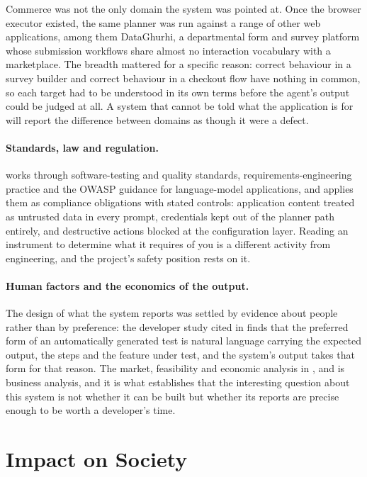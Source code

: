 Commerce was not the only domain the system was pointed at. Once the browser
executor existed, the same planner was run against a range of other web
applications, among them DataGhurhi, a departmental form and survey platform
whose submission workflows share almost no interaction vocabulary with a
marketplace. The breadth mattered for a specific reason: correct behaviour in a
survey builder and correct behaviour in a checkout flow have nothing in common,
so each target had to be understood in its own terms before the agent's output
could be judged at all. A system that cannot be told what the application is
for will report the difference between domains as though it were a defect.

\paragraph{Standards, law and regulation.}  works through
software-testing and quality standards, requirements-engineering practice and
the OWASP guidance for language-model applications, and applies them as
compliance obligations with stated controls: application content treated as
untrusted data in every prompt, credentials kept out of the planner path
entirely, and destructive actions blocked at the configuration layer. Reading
an instrument to determine what it requires of you is a different activity from
engineering, and the project's safety position rests on it.

\paragraph{Human factors and the economics of the output.} The design of what
the system reports was settled by evidence about people rather than by
preference: the developer study cited in  finds that the
preferred form of an automatically generated test is natural language carrying
the expected output, the steps and the feature under test, and the system's
output takes that form for that reason. The market, feasibility and economic
analysis in ,  and 
is business analysis, and it is what establishes that the interesting question
about this system is not whether it can be built but whether its reports are
precise enough to be worth a developer's time.

\section{Impact on Society}
\label{sec:society}

